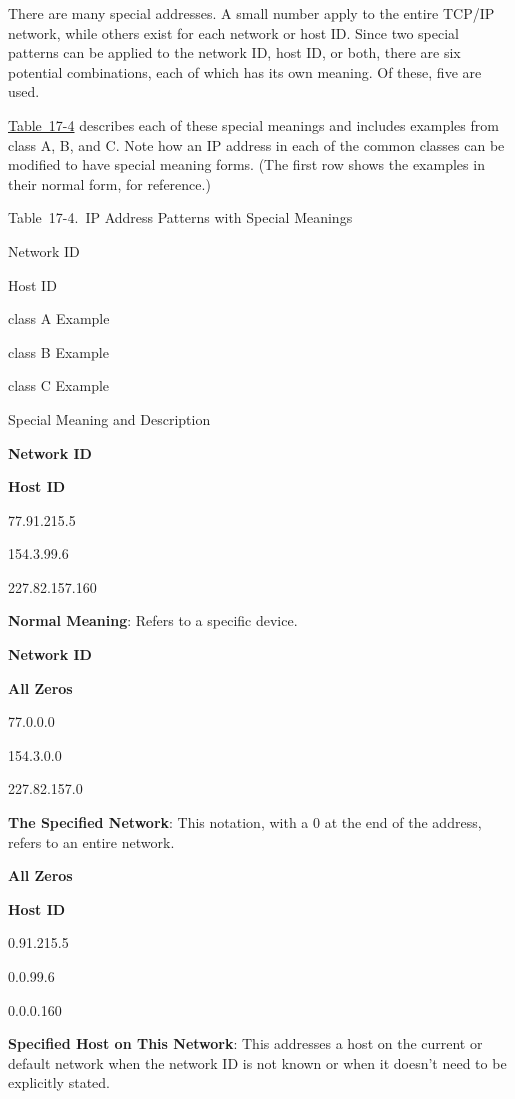 There are many special addresses. A small number apply to the entire
TCP/IP network, while others exist for each network or host ID. Since
two special patterns can be applied to the network ID, host ID, or both,
there are six potential combinations, each of which has its own meaning.
Of these, five are used.

\protect\hyperlink{ch17s04.htmlux5cux23ip_address_patterns_with_special_meaning}{Table~17-4}
describes each of these special meanings and includes examples from
class A, B, and C. Note how an IP address in each of the common classes
can be modified to have special meaning forms. (The first row shows the
examples in their normal form, for reference.)

\protect\hypertarget{ch17s04.htmlux5cux23ip_address_patterns_with_special_meaning}{}{}

Table~17-4.~IP Address Patterns with Special Meanings

Network ID

Host ID

class A Example

class B Example

class C Example

Special Meaning and Description

{\textbf{Network ID}}

{\textbf{Host ID}}

77.91.215.5

154.3.99.6

227.82.157.160

{\textbf{Normal Meaning}}: Refers to a specific device.

{\textbf{Network ID}}

{\textbf{All Zeros}}

77.0.0.0

154.3.0.0

227.82.157.0

{\textbf{The Specified Network}}: This notation,
\protect\hypertarget{ch17s04.htmlux5cux23idx-CHP-17-0696}{}{}with a 0 at
the end of the address, refers to an entire network.

{\textbf{All Zeros}}

{\textbf{Host ID}}

0.91.215.5

0.0.99.6

0.0.0.160

{\textbf{Specified Host on This Network}}: This addresses a host on the
current or default network when the network ID is not known or when it
doesn't need to be explicitly stated.

